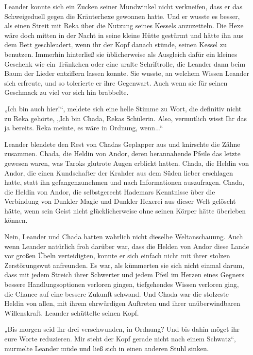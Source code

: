 Leander konnte sich ein Zucken seiner Mundwinkel nicht verkneifen, dass er das Schweigeduell gegen die Kräuterhexe gewonnen hatte. Und er wusste es besser, als einen Streit mit Reka über die Nutzung seines Kessels anzuzetteln. Die Hexe wäre doch mitten in der Nacht in seine kleine Hütte gestürmt und hätte ihn aus dem Bett geschleudert, wenn ihr der Kopf danach stünde, seinen Kessel zu benutzen. Immerhin hinterließ sie üblicherweise als Ausgleich dafür ein kleines Geschenk wie ein Tränkchen oder eine uralte Schriftrolle, die Leander dann beim Baum der Lieder entziffern lassen konnte. Sie wusste, an welchem Wissen Leander sich erfreute, und so tolerierte er ihre Gegenwart. Auch wenn sie für seinen Geschmack zu viel vor sich hin brabbelte.

„Ich bin auch hier!“, meldete sich eine helle Stimme zu Wort, die definitiv nicht zu Reka gehörte, „Ich bin Chada, Rekas Schülerin. Also, vermutlich wisst Ihr das ja bereits. Reka meinte, es wäre in Ordnung, wenn...“

Leander blendete den Rest von Chadas Geplapper aus und knirschte die Zähne zusammen. Chada, die Heldin von Andor, deren herannahende Pfeile das letzte gewesen waren, was Taroks glutrote Augen erblickt hatten. Chada, die Heldin von Andor, die einen Kundschafter der Krahder aus dem Süden lieber erschlagen hatte, statt ihn gefangenzunehmen und nach Informationen auszufragen. Chada, die Heldin von Andor, die selbstgerecht Hademars Kenntnisse über die Verbindung von Dunkler Magie und Dunkler Hexerei aus dieser Welt gelöscht hätte, wenn sein Geist nicht glücklicherweise ohne seinen Körper hätte überleben können.

Nein, Leander und Chada hatten wahrlich nicht dieselbe Weltanschauung. Auch wenn Leander natürlich froh darüber war, dass die Helden von Andor diese Lande vor großen Übeln verteidigten, konnte er sich einfach nicht mit ihrer stolzen Zerstörungswut anfreunden. Es war, als kümmerten sie sich nicht einmal darum, dass mit jedem Streich ihrer Schwerter und jedem Pfeil im Herzen eines Gegners bessere Handlungsoptionen verloren gingen, tiefgehendes Wissen verloren ging, die Chance auf eine bessere Zukunft schwand. Und Chada war die stolzeste Heldin von allen, mit ihrem ehrwürdigen Auftreten und ihrer unüberwindbaren Willenskraft. Leander schüttelte seinen Kopf.

„Bis morgen seid ihr drei verschwunden, in Ordnung? Und bis dahin möget ihr eure Worte reduzieren. Mir steht der Kopf gerade nicht nach einem Schwatz“, murmelte Leander müde und ließ sich in einen anderen Stuhl sinken.

